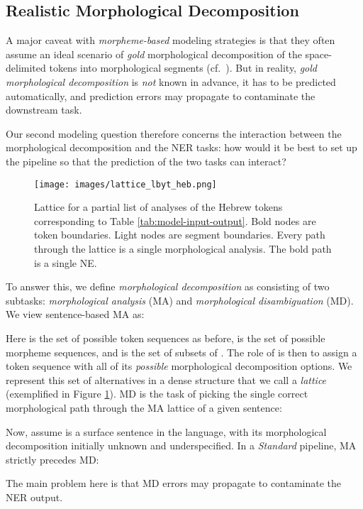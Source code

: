 \documentclass[11pt,a4paper]{article}
\newcommand{\YAPMACRO}{{\em Standard}\xspace}
\begin{document}
\subsection{Realistic Morphological Decomposition} 
A major caveat with  {\em morpheme-based} modeling strategies 
is that they often assume an ideal scenario of {\em gold} morphological decomposition of the  space-delimited tokens  into morphological segments (cf.\  
\citet{nivre-etal-2007-conll, pradhan-etal-2012-conll}).
But in  reality,
 {\em gold morphological decomposition} is  {\em not} known in advance, it has to be predicted automatically, and prediction errors may  propagate to contaminate the downstream task.

Our second modeling question therefore concerns the interaction between the morphological decomposition and the NER tasks:   how would it be best to set up the pipeline so that the prediction of the two tasks can interact?

\begin{figure}[t]
\centering
  \texttt{[image: images/lattice\_lbyt\_heb.png]}
  \caption{\label{fig:lattice} 
  Lattice for a partial list of analyses of the Hebrew tokens  corresponding to Table \ref{tab:model-input-output}. Bold nodes are token boundaries. Light nodes are segment boundaries. Every path through the lattice is a single morphological analysis. The bold path is a single NE.  }
\end{figure}

To answer this, we define  \emph{morphological decomposition} as consisting of two subtasks:  {\em morphological analysis} (MA) and {\em morphological disambiguation} (MD). We view sentence-based MA as:  

Here  is the set of  possible token sequences as before,   is the set of possible morpheme sequences, and
 is the set of subsets of . 
The role of  is then to assign a token sequence   with all of its {\em possible} morphological decomposition options. We represent this set of alternatives  in a dense structure  that we call a \emph{lattice} (exemplified in Figure \ref{fig:lattice}). 
MD is  the task of picking the single correct morphological path  through the MA lattice 
of a given sentence:

 
Now, assume  is a surface sentence in the language, with its morphological decomposition initially unknown and underspecified. 
In a  \YAPMACRO pipeline, MA strictly precedes MD: 
        
The main problem here is that MD errors  may propagate to contaminate the NER output.
\end{document}
